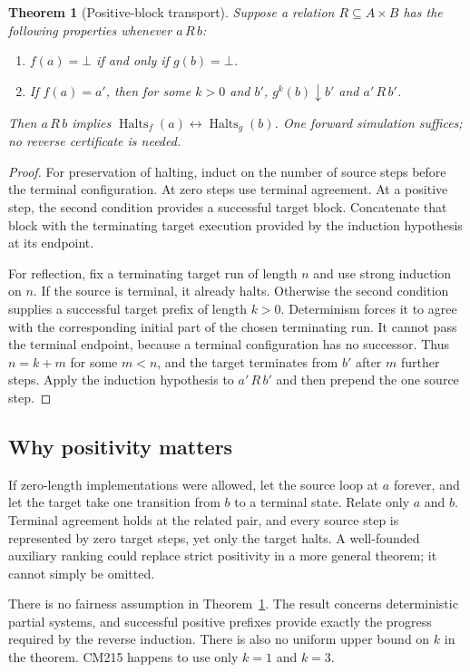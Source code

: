 \documentclass[11pt,letterpaper]{article}
\newtheorem{theorem}{Theorem}[section]
\theoremstyle{definition}
\newcommand{\Halts}{\operatorname{Halts}}
\begin{document}
\begin{theorem}[Positive-block transport]\label{thm:transport}
Suppose a relation $R\subseteq A\times B$ has the following properties
whenever $a\,R\,b$:
\begin{enumerate}
\item $f(a)=\bot$ if and only if $g(b)=\bot$.
\item If $f(a)=a'$, then for some $k>0$ and $b'$,
      $g^k(b)\downarrow b'$ and $a'\,R\,b'$.
\end{enumerate}
Then $a\,R\,b$ implies $\Halts_f(a)\leftrightarrow\Halts_g(b)$.
One forward simulation suffices; no reverse certificate is needed.
\end{theorem}

\begin{proof}
For preservation of halting, induct on the number of source steps before
the terminal configuration. At zero steps use terminal agreement. At a
positive step, the second condition provides a successful target block.
Concatenate that block with the terminating target execution provided by
the induction hypothesis at its endpoint.

For reflection, fix a terminating target run of length $n$ and use strong
induction on $n$. If the source is terminal, it already halts. Otherwise
the second condition supplies a successful target prefix of length $k>0$.
Determinism forces it to agree with the corresponding initial part of the
chosen terminating run. It cannot pass the terminal endpoint, because a
terminal configuration has no successor. Thus $n=k+m$ for some $m<n$,
and the target terminates from $b'$ after $m$ further steps. Apply the
induction hypothesis to $a'\,R\,b'$ and then prepend the one source step.
\end{proof}

\subsection{Why positivity matters}

If zero-length implementations were allowed, let the source loop at $a$
forever, and let the target take one transition from $b$ to a terminal
state. Relate only $a$ and $b$. Terminal agreement holds at the related
pair, and every source step is represented by zero target steps, yet only
the target halts. A well-founded auxiliary ranking could replace strict
positivity in a more general theorem; it cannot simply be omitted.

There is no fairness assumption in Theorem~\ref{thm:transport}. The result
concerns deterministic partial systems, and successful positive prefixes
provide exactly the progress required by the reverse induction. There is
also no uniform upper bound on $k$ in the theorem. CM215 happens to use
only $k=1$ and $k=3$.
\end{document}
